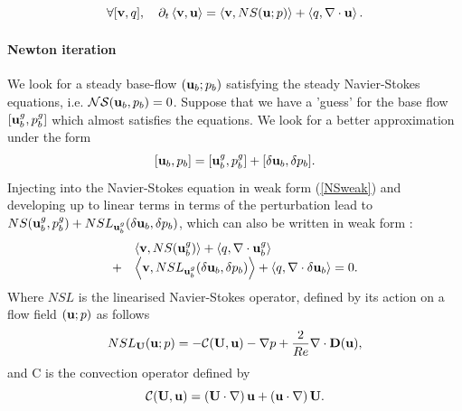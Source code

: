 \documentclass[twocolumn,10pt]{asme2ej}
\newcommand{\be}[1]{ \begin{equation} \label{#1}}
\newcommand{\ee}{\end{equation}}
\newcommand{\bes}[1]{ \begin{equation} \label{#1}\begin{array}{rl}}
\newcommand{\ees}{\end{array}\end{equation}}
\begin{document}
\be{NSweak}
\forall [{\bf v},q], \quad \partial_t \left< {\bf v}, {\bf u}\right> = \left< {\bf v} , NS ({\bf u};p) \right> + \left< q, \nabla \cdot {\bf u}\right>.
\ee















\paragraph{Newton iteration}


We look for a steady base-flow $({\bf u}_b;p_b)$ satisfying the steady Navier-Stokes equations, i.e. 
${\cal NS} ({\bf u}_b,p_b) = 0$.
Suppose that we have a 'guess' for the base flow $[{\bf u}_b^g,p_b^g]$  which almost satisfies the equations.  We look for a better approximation under the form
\be{Newton1}
[{\bf u}_b,p_b]  = [{\bf u}_b^g,p_b^g] + [\delta {\bf u}_b, \delta p_b].
\ee
Injecting into the Navier-Stokes equation in weak form (\ref{NSweak}) and developing up to linear terms in terms of the perturbation lead to  
$NS ({\bf u}_b^g,p_b^g) + NSL_{{\bf u}_b^g}(\delta {\bf u}_b,\delta p_b)$, which can also be written in weak form :
\bes{Newton2}
&\left< {\bf v}, NS ({\bf u}_b^g)\right> + \left<q, \nabla \cdot {\bf u}_b^g\right>  
\\
+ &\left< { \bf v}, NSL_{{\bf u}_b^g}( \delta {\bf u}_b,\delta p_b) \right> + \left<q, \nabla \cdot \delta{\bf u}_b\right> = 0.
\ees
Where $NSL$ is the linearised Navier-Stokes operator, defined by its action on a flow field $({\bf u} ; p)$ as follows 
\be{defNSL}
 NSL_{{\bf U}}( {\bf u} ;  p) = - {\cal C}( {\bf U} , {\bf u}) -\nabla p
+\frac{2}{Re} \nabla  \cdot {\bf D}({\bf u}), %
 \ee
and {\cal C} is the convection operator defined by 
\be{defC}
{\cal C}( {\bf U} , {\bf u}) = \left( {\bf U} \cdot \nabla \right) {\bf u} + \left( {\bf u} \cdot \nabla \right)  {\bf U}.
\ee
\end{document}
